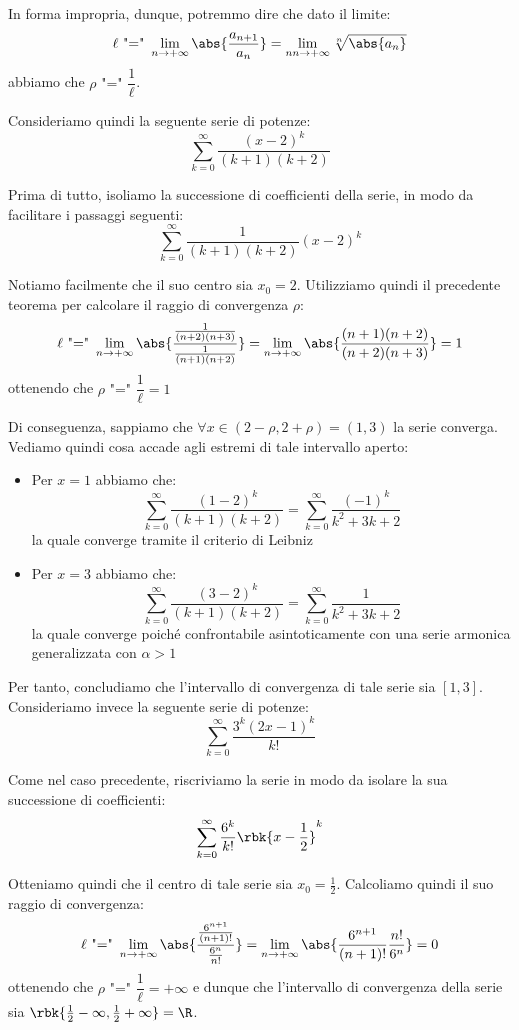 \documentclass[a4paper, 12pt]{report}
\begin{document}
    In forma impropria, dunque, potremmo dire che dato il limite:
    \[\ell \text{ "=" }\lim_{n \to +\infty} \abs{\frac{a_{n+1}}{a_n}} = \lim_{nn \to +\infty} \sqrt[n]{\abs{a_n}}\]
    abbiamo che $\rho \text{ "=" } \dfrac{1}{\ell}$.

    Consideriamo quindi la seguente serie di potenze:
    \[\sum_{k=0}^{\infty} \frac{(x-2)^k}{(k+1)(k+2)}\]

    Prima di tutto, isoliamo la successione di coefficienti della serie, in modo da facilitare i passaggi seguenti:
    \[\sum_{k=0}^{\infty} \frac{1}{(k+1)(k+2)} (x-2)^k\]

    Notiamo facilmente che il suo centro sia $x_0 = 2$. Utilizziamo quindi il precedente teorema per calcolare il raggio di convergenza $\rho$:
    \[\ell \text{ "=" } \lim_{n \to +\infty} \abs{\frac{\frac{1}{(n+2)(n+3)}}{\frac{1}{(n+1)(n+2)}}} = \lim_{n \to +\infty} \abs{\frac{(n+1)(n+2)}{(n+2)(n+3)}} = 1\]
    ottenendo che $\rho \text{ "=" } \dfrac{1}{\ell} = 1$

    Di conseguenza, sappiamo che $\forall x \in (2 - \rho, 2 + \rho) = (1,3)$ la serie converga. Vediamo quindi cosa accade agli estremi di tale intervallo aperto:
    \begin{itemize}
        \item Per $x = 1$ abbiamo che:
        \[\sum_{k=0}^{\infty} \frac{(1-2)^k }{(k+1)(k+2)}= \sum_{k=0}^{\infty} \frac{(-1)^k}{k^2 + 3k + 2}\]
        la quale converge tramite il criterio di Leibniz

        \item Per $x = 3$ abbiamo che:
        \[\sum_{k=0}^{\infty} \frac{(3-2)^k }{(k+1)(k+2)}= \sum_{k=0}^{\infty} \frac{1}{k^2 + 3k + 2}\]
        la quale converge poiché confrontabile asintoticamente con una serie armonica generalizzata con $\alpha > 1$
    \end{itemize}

    Per tanto, concludiamo che l'intervallo di convergenza di tale serie sia $[1, 3]$. Consideriamo invece la seguente serie di potenze:
    \[ \sum_{k=0}^{\infty} \frac{3^k(2x-1)^k}{k!} \]

    Come nel caso precedente, riscriviamo la serie in modo da isolare la sua successione di coefficienti:
    \[ \sum_{k=0}^{\infty} \frac{6^k}{k!}\rbk{x-\frac{1}{2}}^k\]

    Otteniamo quindi che il centro di tale serie sia $x_0 = \frac{1}{2}$. Calcoliamo quindi il suo raggio di convergenza:
    \[\ell \text{ "=" } \lim_{n \to +\infty} \abs{\frac{\frac{6^{n+1}}{(n+1)!}}{\frac{6^n}{n!}}} = \lim_{n \to +\infty} \abs{\frac{6^{n+1}}{(n+1)!}\frac{n!}{6^n}} = 0\]
    ottenendo che $\rho \text{ "=" } \dfrac{1}{\ell} = +\infty$ e dunque che l'intervallo di convergenza della serie sia $\rbk{\frac{1}{2} - \infty, \frac{1}{2} + \infty} = \R$.
\end{document}
